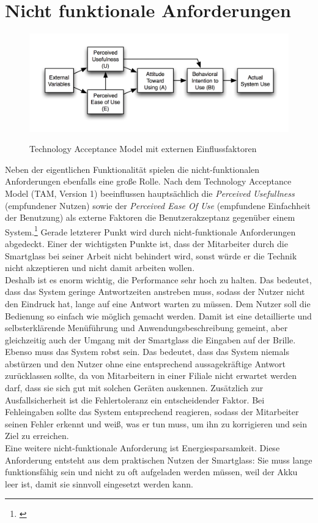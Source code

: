 \section{Nicht funktionale Anforderungen}

\begin{figure}[H]
	\centering
	{\includegraphics[width=\textwidth]{Bilder/Abbildungen/Technology_Acceptance_Model.png}}
	\caption{Technology Acceptance Model mit externen Einflussfaktoren}
	\label{fig:tam}
\end{figure}

Neben der eigentlichen Funktionalität spielen die nicht-funktionalen Anforderungen ebenfalls eine große Rolle. Nach dem Technology Acceptance Model (TAM, Version 1) beeinflussen hauptsächlich die \emph{Perceived Usefullness} (empfundener Nutzen) sowie der \emph{Perceived Ease Of Use} (empfundene Einfachheit der Benutzung) als externe Faktoren die Benutzerakzeptanz gegenüber einem System.\footnote{\citep{tam}} Gerade letzterer Punkt wird durch nicht-funktionale Anforderungen abgedeckt. Einer der wichtigsten Punkte ist, dass der Mitarbeiter durch die Smartglass bei seiner Arbeit nicht behindert wird, sonst würde er die Technik nicht akzeptieren und nicht damit arbeiten wollen.\\

Deshalb ist es enorm wichtig, die Performance sehr hoch zu halten. Das bedeutet, dass das System geringe Antwortzeiten anstreben muss, sodass der Nutzer nicht den Eindruck hat, lange auf eine Antwort warten zu müssen. 
Dem Nutzer soll die Bedienung so einfach wie möglich gemacht werden. Damit ist  eine detaillierte und selbsterklärende Menüführung und Anwendungsbeschreibung gemeint, aber gleichzeitig auch der Umgang mit der Smartglass \bzw die Eingaben auf der Brille. \\
Ebenso muss das System robst sein. Das bedeutet, dass das System niemals abstürzen und den Nutzer ohne eine entsprechend aussagekräftige Antwort zurücklassen sollte, da von Mitarbeitern in einer Filiale nicht erwartet werden darf, dass sie sich gut mit solchen Geräten auskennen. Zusätzlich zur Ausfallsicherheit ist die Fehlertoleranz ein entscheidender Faktor. Bei Fehleingaben sollte das System entsprechend reagieren, sodass der Mitarbeiter seinen Fehler erkennt und weiß, was er tun muss, um ihn zu korrigieren und sein Ziel zu erreichen. \\
Eine weitere nicht-funktionale Anforderung ist Energiesparsamkeit. Diese Anforderung entsteht aus dem praktischen Nutzen der Smartglass: Sie muss lange funktionsfähig sein und nicht zu oft aufgeladen werden müssen, weil der Akku leer ist, damit sie sinnvoll eingesetzt werden kann.\\

